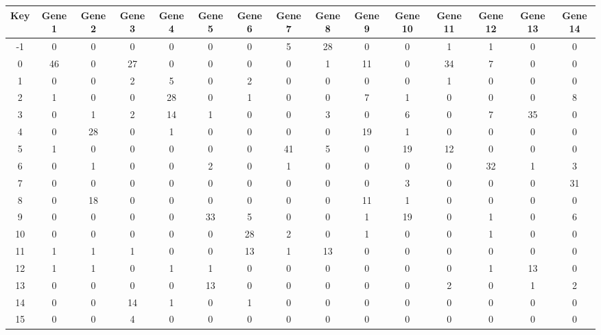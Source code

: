 \begin{tabular}{|c|c|c|c|c|c|c|c|c|c|c|c|c|c|c|}
\hline
Key & Gene 1 & Gene 2 & Gene 3 & Gene 4 & Gene 5 & Gene 6 & Gene 7 & Gene 8 & Gene 9 & Gene 10 & Gene 11 & Gene 12 & Gene 13 & Gene 14 \\
\hline
-1 & 0 & 0 & 0 & 0 & 0 & 0 & 5 & 28 & 0 & 0 & 1 & 1 & 0 & 0 \\
0 & 46 & 0 & 27 & 0 & 0 & 0 & 0 & 1 & 11 & 0 & 34 & 7 & 0 & 0 \\
1 & 0 & 0 & 2 & 5 & 0 & 2 & 0 & 0 & 0 & 0 & 1 & 0 & 0 & 0 \\
2 & 1 & 0 & 0 & 28 & 0 & 1 & 0 & 0 & 7 & 1 & 0 & 0 & 0 & 8 \\
3 & 0 & 1 & 2 & 14 & 1 & 0 & 0 & 3 & 0 & 6 & 0 & 7 & 35 & 0 \\
4 & 0 & 28 & 0 & 1 & 0 & 0 & 0 & 0 & 19 & 1 & 0 & 0 & 0 & 0 \\
5 & 1 & 0 & 0 & 0 & 0 & 0 & 41 & 5 & 0 & 19 & 12 & 0 & 0 & 0 \\
6 & 0 & 1 & 0 & 0 & 2 & 0 & 1 & 0 & 0 & 0 & 0 & 32 & 1 & 3 \\
7 & 0 & 0 & 0 & 0 & 0 & 0 & 0 & 0 & 0 & 3 & 0 & 0 & 0 & 31 \\
8 & 0 & 18 & 0 & 0 & 0 & 0 & 0 & 0 & 11 & 1 & 0 & 0 & 0 & 0 \\
9 & 0 & 0 & 0 & 0 & 33 & 5 & 0 & 0 & 1 & 19 & 0 & 1 & 0 & 6 \\
10 & 0 & 0 & 0 & 0 & 0 & 28 & 2 & 0 & 1 & 0 & 0 & 1 & 0 & 0 \\
11 & 1 & 1 & 1 & 0 & 0 & 13 & 1 & 13 & 0 & 0 & 0 & 0 & 0 & 0 \\
12 & 1 & 1 & 0 & 1 & 1 & 0 & 0 & 0 & 0 & 0 & 0 & 1 & 13 & 0 \\
13 & 0 & 0 & 0 & 0 & 13 & 0 & 0 & 0 & 0 & 0 & 2 & 0 & 1 & 2 \\
14 & 0 & 0 & 14 & 1 & 0 & 1 & 0 & 0 & 0 & 0 & 0 & 0 & 0 & 0 \\
15 & 0 & 0 & 4 & 0 & 0 & 0 & 0 & 0 & 0 & 0 & 0 & 0 & 0 & 0 \\
\hline
\end{tabular}